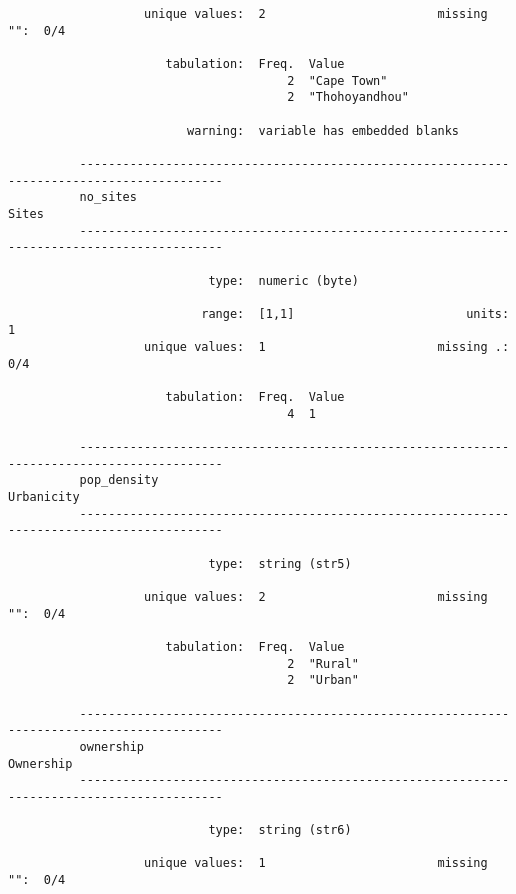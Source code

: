 \documentclass{article}
\begin{document}
\begin{verbatim}
                   unique values:  2                        missing "":  0/4
          
                      tabulation:  Freq.  Value
                                       2  "Cape Town"
                                       2  "Thohoyandhou"
          
                         warning:  variable has embedded blanks
          
          ------------------------------------------------------------------------------------------
          no_sites                                                                             Sites
          ------------------------------------------------------------------------------------------
          
                            type:  numeric (byte)
          
                           range:  [1,1]                        units:  1
                   unique values:  1                        missing .:  0/4
          
                      tabulation:  Freq.  Value
                                       4  1
          
          ------------------------------------------------------------------------------------------
          pop_density                                                                     Urbanicity
          ------------------------------------------------------------------------------------------
          
                            type:  string (str5)
          
                   unique values:  2                        missing "":  0/4
          
                      tabulation:  Freq.  Value
                                       2  "Rural"
                                       2  "Urban"
          
          ------------------------------------------------------------------------------------------
          ownership                                                                        Ownership
          ------------------------------------------------------------------------------------------
          
                            type:  string (str6)
          
                   unique values:  1                        missing "":  0/4
          

\end{verbatim}
\end{document}
